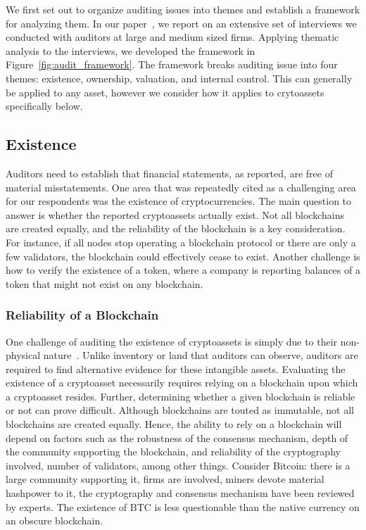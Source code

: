 We first set out to organize auditing issues into themes and establish a framework for analyzing them. In our paper~\cite{pimentel2021systemizing}, we report on an extensive set of interviews we conducted with auditors at large and medium sized firms. Applying thematic analysis to the interviews, we developed the framework in Figure~\ref{fig:audit_framework}. The framework breaks auditing issue into four themes: existence, ownership, valuation, and internal control. This can generally be applied to any asset, however we consider how it applies to crytoassets specifically below.


\subsection{Existence} \label{sec:auditing:framework:existence}
Auditors need to establish that financial statements, as reported, are free of material misstatements. One area that was repeatedly cited as a challenging area for our respondents was the existence of cryptocurrencies. The main question to answer is whether the reported cryptoassets actually exist. Not all blockchains are created equally, and the reliability of the blockchain is a key consideration. For instance, if all nodes stop operating a blockchain protocol or there are only a few validators, the blockchain could effectively cease to exist. Another challenge is how to verify the existence of a token, where a company is reporting balances of a token that might not exist on any blockchain. 


\subsubsection{Reliability of a Blockchain}

One challenge of auditing the existence of cryptoassets is simply due to their non-physical nature~\cite{pimentel2021systemizing}. Unlike inventory or land that auditors can observe, auditors are required to find alternative evidence for these intangible assets. Evaluating the existence of a cryptoasset necessarily requires relying on a blockchain upon which a cryptoasset resides. Further, determining whether a given blockchain is reliable or not can prove difficult. Although blockchains are touted as immutable, not all blockchains are created equally. Hence, the ability to rely on a blockchain will depend on factors such as the robustness of the consensus mechanism, depth of the community supporting the blockchain, and reliability of the cryptography involved, number of validators, among other things. Consider Bitcoin: there is a large community supporting it, firms are involved, miners devote material hashpower to it, the cryptography and consensus mechanism have been reviewed by experts. The existence of BTC is less questionable than the native currency on an obscure blockchain.

